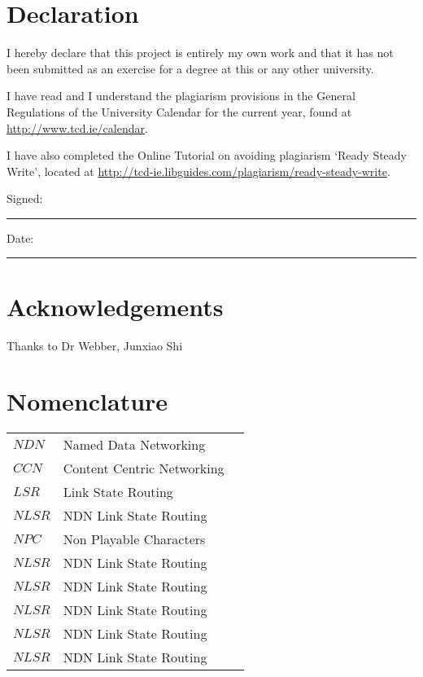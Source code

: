 \section{Declaration}
\vspace{1cm}
I hereby declare that this project is entirely my own work and that it has not been submitted as an exercise for a degree at this or any other university.

\vspace{1cm}
I have read and I understand the plagiarism provisions in the General Regulations of the University Calendar for the current year, found at \url{http://www.tcd.ie/calendar}.
\vspace{1cm}

I have also completed the Online Tutorial on avoiding plagiarism `Ready Steady Write', located at
\url{http://tcd-ie.libguides.com/plagiarism/ready-steady-write}.
\vspace{3cm}

Signed:~\rule{5cm}{0.3pt}\hfill Date:~\rule{5cm}{0.3pt}

\newpage
\onehalfspacing
\raggedright %

\section{Acknowledgements}
Thanks to Dr Webber, Junxiao Shi

\tableofcontents
\listoffigures
\listoftables
\lstlistoflistings
\newpage


\section{Nomenclature}
\begin{tabular}{lp{15cm}l}
    $NDN$ & Named Data Networking \\
    $CCN$ & Content Centric Networking \\
    $LSR$ & Link State Routing \\
    $NLSR$ & NDN Link State Routing \\
    $NPC$ & Non Playable Characters \\
    $NLSR$ & NDN Link State Routing \\
    $NLSR$ & NDN Link State Routing \\
    $NLSR$ & NDN Link State Routing \\
    $NLSR$ & NDN Link State Routing \\
    $NLSR$ & NDN Link State Routing \\
\end{tabular}
\vspace{2cm}
